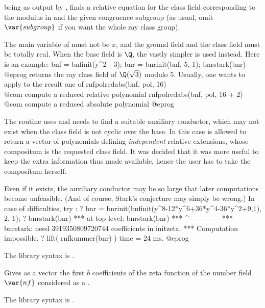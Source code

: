 \label{se:bnrstark}
 being as output by , finds a relative equation
for the class field corresponding to the modulus in  and the given
congruence subgroup (as usual, omit $\var{subgroup}$ if you want the whole ray
class group).

The main variable of  must not be $x$, and the ground field and the
class field must be totally real. When the base field is $\Q$, the vastly
simpler  is used instead. Here is an example:
\bprog
bnf = bnfinit(y^2 - 3);
bnr = bnrinit(bnf, 5, 1);
bnrstark(bnr)
@eprog\noindent
returns the ray class field of $\Q(\sqrt{3})$ modulo $5$. Usually, one wants
to apply to the result one of
\bprog
rnfpolredabs(bnf, pol, 16)     \\@com compute a reduced relative polynomial
rnfpolredabs(bnf, pol, 16 + 2) \\@com compute a reduced absolute polynomial
@eprog

The routine uses  and needs to find a suitable auxiliary
conductor, which may not exist when the class field is not cyclic over the
base. In this case  is allowed to return a vector of
polynomials defining \emph{independent} relative extensions, whose compositum
is the requested class field. It was decided that it was more useful
to keep the extra information thus made available, hence the user has to take
the compositum herself.

Even if it exists, the auxiliary conductor may be so large that later
computations become unfeasible. (And of course, Stark's conjecture may simply
be wrong.) In case of difficulties, try :
\bprog
? bnr = bnrinit(bnfinit(y^8-12*y^6+36*y^4-36*y^2+9,1), 2, 1);
? bnrstark(bnr)
  ***   at top-level: bnrstark(bnr)
  ***                 ^-------------
  *** bnrstark: need 3919350809720744 coefficients in initzeta.
  *** Computation impossible.
? lift( rnfkummer(bnr) )
time = 24 ms.
@eprog

The library syntax is .

\label{se:dirzetak}
Gives as a vector the first $b$
coefficients of the  zeta function of the number field $\var{nf}$
considered as a .

The library syntax is .


